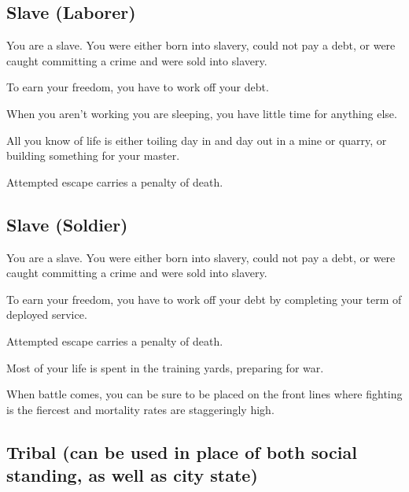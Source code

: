 \begin{multicols}{2}
\subsection{Slave (Laborer)}

\begin{description}
    \item You are a slave. You were either born into slavery, could not pay a debt, or were caught committing a crime and were sold into slavery.
    \item To earn your freedom, you have to work off your debt.
    \item When you aren’t working you are sleeping, you have little time for anything else.
    \item All you know of life is either toiling day in and day out in a mine or quarry, or building something for your master.
    \item Attempted escape carries a penalty of death.
\end{description}

\subsection{Slave (Soldier)}

\begin{description}
    \item You are a slave. You were either born into slavery, could not pay a debt, or were caught committing a crime and were sold into slavery.
    \item To earn your freedom, you have to work off your debt by completing your term of deployed service.
    \item Attempted escape carries a penalty of death.
    \item Most of your life is spent in the training yards, preparing for war.
    \item When battle comes, you can be sure to be placed on the front lines where fighting is the fiercest and mortality rates are staggeringly high.
\end{description}

\subsection{Tribal (can be used in place of both social standing, as well as city state)}


\end{multicols}
